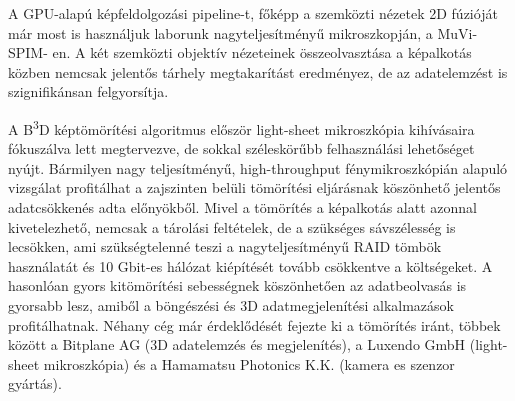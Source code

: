 \documentclass{booklet_style}
\def\b3d{B\textsuperscript{3}D}
\begin{document}
A GPU-alapú képfeldolgozási pipeline-t, főképp a szemközti nézetek 2D fúzióját már most is használjuk laborunk nagyteljesítményű mikroszkopján, a MuVi-SPIM- en. A két szemközti objektív nézeteinek összeolvasztása a képalkotás közben nemcsak jelentős tárhely megtakarítást eredményez, de az adatelemzést is szignifikánsan felgyorsítja.

A \b3d képtömörítési algoritmus először light-sheet mikroszkópia kihívásaira fókuszálva lett megtervezve, de sokkal széleskörűbb felhasználási lehetőséget nyújt. Bármilyen nagy teljesítményű, high-throughput fénymikroszkópián alapuló vizsgálat profitálhat a zajszinten belüli tömörítési eljárásnak köszönhető jelentős adatcsökkenés adta előnyökből. Mivel a tömörítés a képalkotás alatt azonnal kivetelezhető, nemcsak a tárolási feltételek, de a szükséges sávszélesség is lecsökken, ami szükségtelenné teszi a nagyteljesítményű RAID tömbök használatát és 10 Gbit-es hálózat kiépítését tovább csökkentve a költségeket. A hasonlóan gyors kitömörítési sebességnek köszönhetően az
adatbeolvasás is gyorsabb lesz, amiből a böngészési és 3D adatmegjelenítési alkalmazások profitálhatnak. Néhany cég már érdeklődését fejezte ki a tömörítés iránt, többek között a Bitplane AG (3D adatelemzés és megjelenítés), a Luxendo GmbH (light-sheet mikroszkópia) és a Hamamatsu Photonics K.K. (kamera es szenzor gyártás).





\printbibliography[category=journal, title={A szerző közleményei a témában}, heading=secbib]

\nocite{jakus_genetic_2010,gyorffy_recurrenceonline:_2011,shi_combined_2014}
\printbibliography[category=others, title={A szerző további közleményei}, heading=secbib, resetnumbers=5]

\printbibliography[category=conference, title={A szerző konferencia előadásai}, heading=secbib]

\newrefcontext
\printbibliography[notcategory=journal,notcategory=conference,notcategory=others, resetnumbers=true, title={Refernciák}, heading=secbib]


\end{document}

